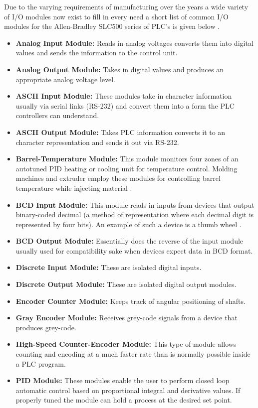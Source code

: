 Due to the varying requirements of manufacturing over the years a wide variety of I/O modules now exist to fill in every need a short list of common I/O modules for the Allen-Bradley SLC500 series of PLC's is given below \cite{slc500}.
\begin{itemize}
	\item \textbf{Analog Input Module:} Reads in analog voltages converts them into digital values and sends the information to the control unit.
	\item \textbf{Analog Output Module:} Takes in digital values and produces an appropriate analog voltage level.
	\item \textbf{ASCII Input Module:} These modules take in character information usually via serial links (RS-232) and convert them into a form the PLC controllers can understand\cite{slc500}.
	\item \textbf{ASCII Output Module:} Takes PLC information converts it to an character representation and sends it out via RS-232.
	\item \textbf{Barrel-Temperature Module:} This module monitors four zones of an autotuned PID heating or cooling unit for temperature control. Molding machines and extruder employ these modules for controlling barrel temperature while injecting material \cite{slc500}.
	\item \textbf{BCD Input Module:} This module reads in inputs from devices that output binary-coded decimal (a method of representation where each decimal digit is represented by four bits). An example of such a device is a thumb wheel \cite{slc500}.
	\item \textbf{BCD Output Module:} Essentially does the reverse of the input module usually used for compatibility sake when devices expect data in BCD format.
	\item \textbf{Discrete Input Module:} These are isolated digital inputs.
	\item \textbf{Discrete Output Module:} These are isolated digital output modules.
	\item \textbf{Encoder Counter Module:} Keeps track of angular positioning of shafts.
	\item \textbf{Gray Encoder Module:} Receives grey-code signals from a device that produces grey-code.
	\item \textbf{High-Speed Counter-Encoder Module:} This type of module allows counting and encoding at a much faster rate than is normally possible inside a PLC program.
	\item \textbf{PID Module:} These modules enable the user to perform closed loop automatic control based on proportional integral and derivative values. If properly tuned the module can hold a process at the desired set point.

\end{itemize}
